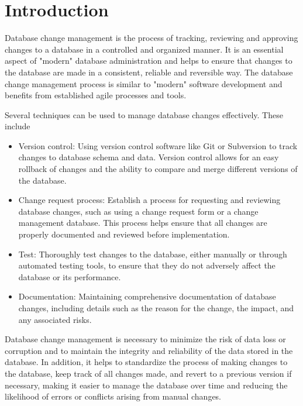 


\chapter{Introduction}
%
Database change management is the process of tracking, reviewing and approving changes to a database in a controlled and organized manner. It is an essential aspect of "modern" database administration and helps to ensure that changes to the database are made in a consistent, reliable and reversible way. The database change management process is similar to "modern" software development and benefits from established agile processes and tools.

Several techniques can be used to manage database changes effectively. These include

\begin{itemize}
	\item Version control: Using version control software like Git or Subversion to track changes to database schema and data. Version control allows for an easy rollback of changes and the ability to compare and merge different versions of the database.
	
	\item Change request process: Establish a process for requesting and reviewing database changes, such as using a change request form or a change management database. This process helps ensure that all changes are properly documented and reviewed before implementation.
	
	\item Test: Thoroughly test changes to the database, either manually or through automated testing tools, to ensure that they do not adversely affect the database or its performance.
	
	\item Documentation: Maintaining comprehensive documentation of database changes, including details such as the reason for the change, the impact, and any associated risks.
	
\end{itemize}

Database change management is necessary to minimize the risk of data loss or corruption and to maintain the integrity and reliability of the data stored in the database. In addition, it helps to standardize the process of making changes to the database, keep track of all changes made, and revert to a previous version if necessary, making it easier to manage the database over time and reducing the likelihood of errors or conflicts arising from manual changes.

